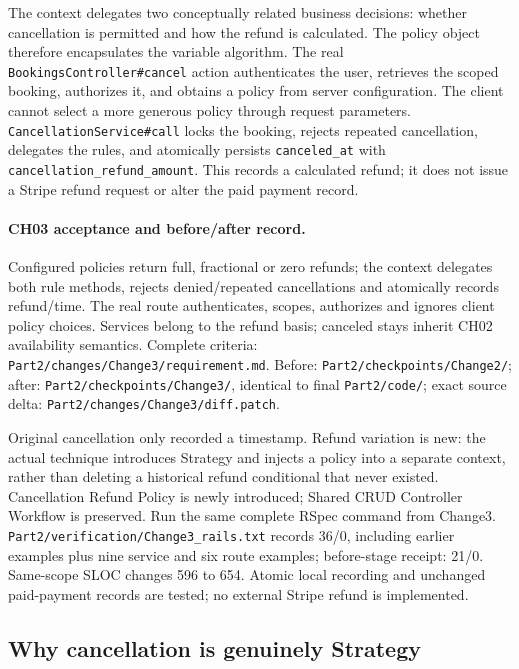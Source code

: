 \documentclass[10pt,a4paper]{article}
\newcommand{\code}[1]{\texttt{\small #1}}
\begin{document}
The context delegates two conceptually related business decisions: whether cancellation is permitted and how the refund is calculated. The policy object therefore encapsulates the variable algorithm. The real \code{BookingsController\#cancel} action authenticates the user, retrieves the scoped booking, authorizes it, and obtains a policy from server configuration. The client cannot select a more generous policy through request parameters. \code{CancellationService\#call} locks the booking, rejects repeated cancellation, delegates the rules, and atomically persists \code{canceled\_at} with \code{cancellation\_refund\_amount}. This records a calculated refund; it does not issue a Stripe refund request or alter the paid payment record.



\paragraph{CH03 acceptance and before/after record.}
Configured policies return full, fractional or zero refunds; the context delegates both rule methods, rejects denied/repeated cancellations and atomically records refund/time. The real route authenticates, scopes, authorizes and ignores client policy choices. Services belong to the refund basis; canceled stays inherit CH02 availability semantics. Complete criteria: \code{Part2/changes/Change3/requirement.md}. Before: \code{Part2/checkpoints/Change2/}; after: \code{Part2/checkpoints/Change3/}, identical to final \code{Part2/code/}; exact source delta: \code{Part2/changes/Change3/diff.patch}.

Original cancellation only recorded a timestamp. Refund variation is new: the actual technique introduces Strategy and injects a policy into a separate context, rather than deleting a historical refund conditional that never existed. Cancellation Refund Policy is newly introduced; Shared CRUD Controller Workflow is preserved. Run the same complete RSpec command from Change3. \code{Part2/verification/Change3\_rails.txt} records 36/0, including earlier examples plus nine service and six route examples; before-stage receipt: 21/0. Same-scope SLOC changes 596 to 654. Atomic local recording and unchanged paid-payment records are tested; no external Stripe refund is implemented.

\subsection{Why cancellation is genuinely Strategy}
\end{document}

